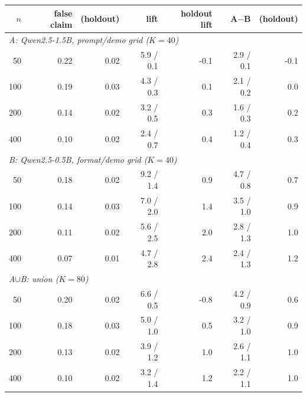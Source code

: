 \begin{tabular}{rrrrrrr}\toprule
$n$ & false claim & (holdout) & lift & holdout lift & A$-$B & (holdout) \\\midrule
\multicolumn{7}{l}{\emph{A: Qwen2.5-1.5B, prompt/demo grid ($K{=}40$)}} \\
50 & 0.22 & 0.02 & 5.9 / 0.1 & -0.1 & 2.9 / 0.1 & -0.1 \\
100 & 0.19 & 0.03 & 4.3 / 0.3 & 0.1 & 2.1 / 0.2 & 0.0 \\
200 & 0.14 & 0.02 & 3.2 / 0.5 & 0.3 & 1.6 / 0.3 & 0.2 \\
400 & 0.10 & 0.02 & 2.4 / 0.7 & 0.4 & 1.2 / 0.4 & 0.3 \\
\multicolumn{7}{l}{\emph{B: Qwen2.5-0.5B, format/demo grid ($K{=}40$)}} \\
50 & 0.18 & 0.02 & 9.2 / 1.4 & 0.9 & 4.7 / 0.8 & 0.7 \\
100 & 0.14 & 0.03 & 7.0 / 2.0 & 1.4 & 3.5 / 1.0 & 0.9 \\
200 & 0.11 & 0.02 & 5.6 / 2.5 & 2.0 & 2.8 / 1.3 & 1.0 \\
400 & 0.07 & 0.01 & 4.7 / 2.8 & 2.4 & 2.4 / 1.3 & 1.2 \\
\multicolumn{7}{l}{\emph{A$\cup$B: union ($K{=}80$)}} \\
50 & 0.20 & 0.02 & 6.6 / 0.5 & -0.8 & 4.2 / 0.9 & 0.6 \\
100 & 0.18 & 0.03 & 5.0 / 1.0 & 0.5 & 3.2 / 1.0 & 0.9 \\
200 & 0.13 & 0.02 & 3.9 / 1.2 & 1.0 & 2.6 / 1.1 & 1.0 \\
400 & 0.10 & 0.02 & 3.2 / 1.4 & 1.2 & 2.2 / 1.1 & 1.0 \\
\bottomrule
\end{tabular}
